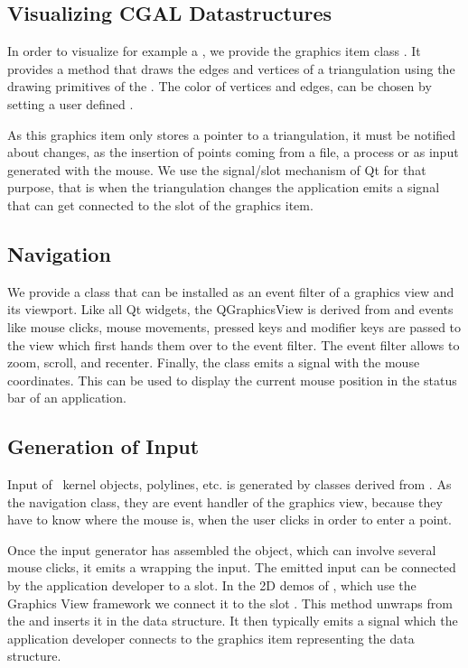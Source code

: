\subsection{Visualizing CGAL Datastructures}

In order to visualize for example a , we
provide the graphics item class .
It provides a  method that draws the edges and vertices of a triangulation
using the drawing primitives of the .   The color of vertices and edges, 
can be chosen by setting a user defined  .


As this graphics item only stores a pointer to a triangulation, it
must be notified about changes, as the insertion of points coming from
a file, a process or as input generated with the mouse.  We
use the signal/slot mechanism of Qt for that purpose, that is when the
triangulation changes the application emits a signal that can get connected to the
 slot of the graphics item.



\subsection{Navigation}

We provide a class  that can be
installed as an event filter of a graphics view and its viewport. Like
all Qt widgets, the {QGraphicsView} is derived from
 and events like mouse clicks, mouse movements, pressed keys and 
modifier keys are passed to the view which first hands them over to the
event filter.  The  event filter allows to zoom, scroll, and recenter.
Finally, the class emits a signal with the mouse coordinates. This can be used
to display the current mouse position in the status bar of an application.

\subsection{Generation of Input}

Input of \cgal\ kernel objects, polylines, etc. is generated by classes derived
from .  As the navigation class, they are event handler of the
graphics view, because they have to know where the mouse is, when the user clicks
in order to enter a point.

Once the input generator has assembled the object, which can involve several mouse clicks,
it emits a  wrapping the input.  The emitted input can be connected
by the application developer to a slot. In the 2D demos of \cgal, which use the 
Graphics View framework we connect it to the slot .
This method unwraps from the  and inserts it in the data structure. 
It then typically emits a signal  which the application developer 
connects to the graphics item representing the data structure.

